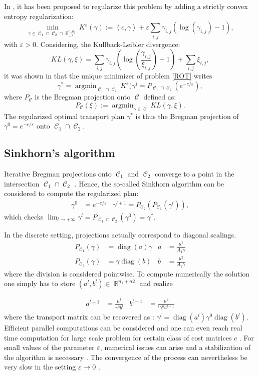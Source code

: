 \documentclass{article} %
\newcommand{\scal}[2]{\left\langle #1 , #2 \right\rangle}
\DeclareMathOperator{\IR}{\mathbb{R}}
\DeclareMathOperator*{\argmin}{argmin}
\DeclareMathOperator{\Ccal}{\mathcal{C}}
\DeclareMathOperator{\diag}{diag}
\renewcommand{\epsilon}{\varepsilon}
\theoremstyle{plain}
\theoremstyle{definition}
\theoremstyle{remark}
\begin{document}
In \cite{cuturi13}, it has been proposed to regularize this problem by adding a strictly convex entropy regularization:
\begin{equation}\label{ROT}
\min_{\gamma\in\Ccal_1\cap \Ccal_2\cap \IR^{n_1 n_2}_{+*}}K^\epsilon(\gamma) := \scal{c}{\gamma} 
+ \epsilon \sum_{i,j} \gamma_{i,j} (\log(\gamma_{i,j}) - 1)
,\end{equation}
with $\epsilon>0$. Considering, the Kullback-Leibler divergence:
\[ 
KL(\gamma,\xi) = \sum_{i,j} \gamma_{i,j} \left( \log \left( \frac{\gamma_{i,j}}{\xi_{i,j}} \right) -1  \right) + \sum_{i,j} \xi_{i,j},
\]
it was shown in \cite{benamou15}  that the unique minimizer of problem \eqref{ROT} writes
\begin{equation}\label{eq:reg_ot_pb}
\gamma^* = \argmin_{\Ccal_1 \cap \Ccal_2} K^\epsilon(\gamma^)= P_{\Ccal_1 \cap \Ccal_2} (e^{-c/\epsilon}),
\end{equation}
where $P_{\Ccal}$ is the  Bregman projection onto $\Ccal$ defined as:
\[
P_{\Ccal}(\xi) := \argmin_{\gamma \in \Ccal} KL(\gamma,\xi).
\]
The regularized  optimal transport plan $\gamma^*$ is thus the Bregman projection of $\gamma^0 = e^{-c/\epsilon}$ onto $\Ccal_1 \cap \Ccal_2$.


\subsection{Sinkhorn's algorithm}
Iterative Bregman projections onto $\Ccal_1$ and $\Ccal_2$ converge to a point in the intersection $\Ccal_1 \cap \Ccal_2$ \cite{bregman67}. Hence, the so-called Sinkhorn algorithm \cite{sinkhorn64} can be considered to compute the regularized  plan:
\begin{align*}
\gamma^0 &= e^{-c/\epsilon} &
\gamma^{l+1} = P_{\Ccal_2}(P_{\Ccal_1}(\gamma^l)),
\end{align*}
which checks 
$\lim_{l\rightarrow +\infty} \gamma^l = P_{\Ccal_1 \cap \Ccal_2}(\gamma^0) = \gamma^*.$

In the discrete setting,  projections actually correspond to diagonal scalings.
\begin{align*}
P_{\Ccal_1}(\gamma) &= \diag(a) \gamma &
a &=  \frac{\mu^1}{A_1 \gamma} \\
P_{\Ccal_2}(\gamma) &= \gamma \diag(b) &
b &= \frac{\mu^2}{A_2 \gamma}
\end{align*}
where the division is considered pointwise. 
To compute numerically the solution  one simply has to store $(a^l, b^l)\in\IR^{n_1+n2}$ and realize

\begin{align*}
a^{l+1} &= \frac{\mu^1}{\gamma^0 b^l} &
b^{l+1} &= \frac{\mu^2}{^t \gamma^0 a^{l+1}} 
\end{align*}
where the transport matrix can be recovered as :
$\gamma^l = \diag(a^l) \gamma^0 \diag(b^l).$ 
Efficient parallel computations can be considered \cite{cuturi13} and one can even reach real time computation for large scale problem for certain class of cost matrices $c$ \cite{Solomon2015}. 
For small values of the parameter $\epsilon$, numerical issues can arise and a stabilization of the algorithm is necessary \cite{2016arXiv160705816C}.
The convergence of the process can nevertheless be very slow  in the setting $\epsilon\to 0$ .
\end{document}

